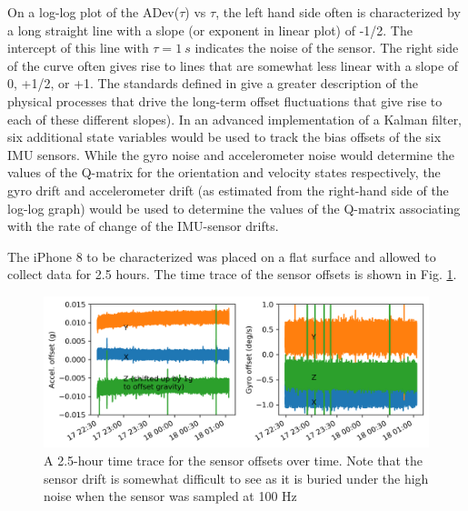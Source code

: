 \documentclass[10pt]{article}
\begin{document}

On a log-log plot of the ADev($\tau$) vs $\tau$, the left hand side often is characterized by a long straight line with a slope (or exponent in linear plot) of -1/2. The intercept of this line with $\tau = \SI{1}{s}$ indicates the noise of the sensor. The right side of the curve often gives rise to lines that are somewhat less linear with a slope of 0, +1/2, or +1. The standards defined in \cite{IEEEgyroscopecharacterization} give a greater description of the physical processes that drive the long-term offset fluctuations that give rise to each of these different slopes). In an advanced implementation of a Kalman filter, six additional state variables would be used to track the bias offsets of the six IMU sensors. While the gyro noise and accelerometer noise would determine the values of the Q-matrix for the orientation and velocity states respectively, the gyro drift and accelerometer drift (as estimated from the right-hand side of the log-log graph) would be used to determine the values of the Q-matrix associating with the rate of change of the IMU-sensor drifts. 

The iPhone 8 to be characterized was placed on a flat surface and allowed to collect data for 2.5 hours. The time trace of the sensor offsets is shown in Fig. \ref{fig:imu-offset-traces}.

\begin{figure}
  \centering
  \includegraphics[width=\textwidth]{../images/time-trace-characterization2.png}
  \caption{\label{fig:imu-offset-traces} A 2.5-hour time trace for the sensor offsets over time. Note that the sensor drift is somewhat difficult to see as it is buried under the high noise when the sensor was sampled at 100 Hz}
\end{figure}
\end{document}
